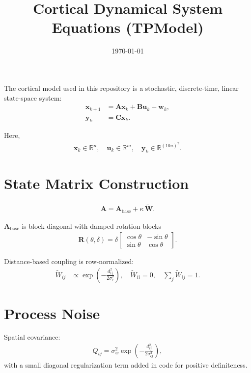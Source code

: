 \documentclass[11pt]{article}
\title{Cortical Dynamical System Equations (TPModel)}
\author{}
\date{\today}
\begin{document}
\maketitle

The cortical model used in this repository is a stochastic, discrete-time, linear state-space system:
\begin{align}
\mathbf{x}_{k+1} &= \mathbf{A}\mathbf{x}_k + \mathbf{B}\mathbf{u}_k + \mathbf{w}_k, \\
\mathbf{y}_k &= \mathbf{C}\mathbf{x}_k.
\end{align}

Here,
\begin{align}
\mathbf{x}_k \in \mathbb{R}^{n},\quad
\mathbf{u}_k \in \mathbb{R}^{m},\quad
\mathbf{y}_k \in \mathbb{R}^{(10n)^2}.
\end{align}

\section*{State Matrix Construction}
\begin{align}
\mathbf{A} = \mathbf{A}_{\mathrm{base}} + \kappa\,\widetilde{\mathbf{W}}.
\end{align}

\(\mathbf{A}_{\mathrm{base}}\) is block-diagonal with damped rotation blocks
\begin{align}
\mathbf{R}(\theta,\delta)
= \delta
\begin{bmatrix}
\cos\theta & -\sin\theta \\
\sin\theta & \cos\theta
\end{bmatrix}.
\end{align}

Distance-based coupling is row-normalized:
\begin{align}
\widetilde{W}_{ij} &\propto \exp\!\left(-\frac{d_{ij}^2}{2\sigma_c^2}\right),
\quad \widetilde{W}_{ii}=0,
\quad \sum_j \widetilde{W}_{ij}=1.
\end{align}

\section*{Process Noise}
Spatial covariance:
\begin{align}
Q_{ij} = \sigma_w^2\exp\!\left(-\frac{d_{ij}^2}{2\sigma_Q^2}\right),
\end{align}
with a small diagonal regularization term added in code for positive definiteness.
\end{document}
